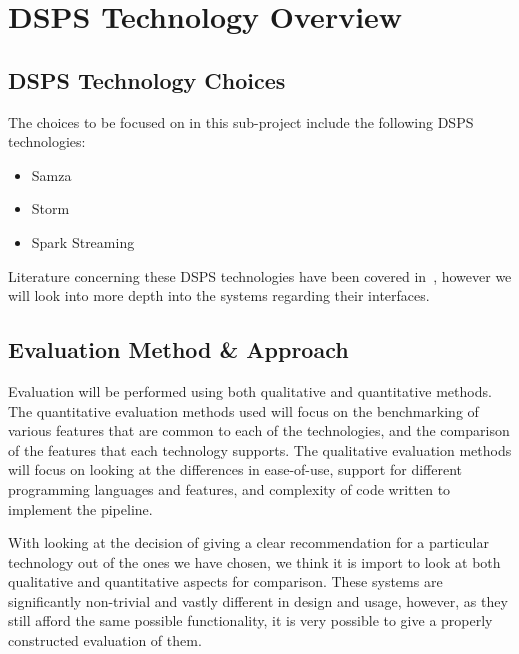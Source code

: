 \section{DSPS Technology Overview}
\label{sec:overview}



\subsection{DSPS Technology Choices} %
\label{sub:dsps_technology_choices}

The choices to be focused on in this sub-project include the following DSPS technologies:

\begin{itemize}
  \item Samza
  \item Storm
  \item Spark Streaming
\end{itemize}

Literature concerning these DSPS technologies have been covered in~, however
we will look into more depth into the systems regarding their interfaces.




\subsection{Evaluation Method \& Approach} %
\label{sub:evaluation_method_approach}

Evaluation will be performed using both qualitative and quantitative methods. The quantitative evaluation methods used will focus
on the benchmarking of various features that are common to each of the technologies, and the comparison of the features that
each technology supports. The qualitative evaluation methods will focus on looking at the differences in ease-of-use,
support for different programming languages and features, and complexity of code written to implement the pipeline.

With looking at the decision of giving a clear recommendation for a particular technology out of the ones we have chosen,
we think it is import to look at both qualitative and quantitative aspects for comparison. These systems are significantly
non-trivial and vastly different in design and usage, however, as they still afford the same possible functionality,
it is very possible to give a properly constructed evaluation of them.


